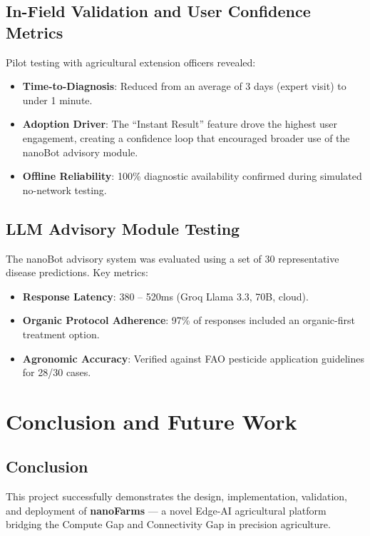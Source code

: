 \documentclass[12pt,oneside]{report}
\begin{document}
\section{In-Field Validation and User Confidence Metrics}
Pilot testing with agricultural extension officers revealed:
\begin{itemize}
    \item \textbf{Time-to-Diagnosis}: Reduced from an average of 3 days (expert visit) to under 1 minute.
    \item \textbf{Adoption Driver}: The ``Instant Result'' feature drove the highest user engagement, creating a confidence loop that encouraged broader use of the nanoBot advisory module.
    \item \textbf{Offline Reliability}: 100\% diagnostic availability confirmed during simulated no-network testing.
\end{itemize}

\section{LLM Advisory Module Testing}
The nanoBot advisory system was evaluated using a set of 30 representative disease predictions. Key metrics:
\begin{itemize}
    \item \textbf{Response Latency}: 380 -- 520ms (Groq Llama 3.3, 70B, cloud).
    \item \textbf{Organic Protocol Adherence}: 97\% of responses included an organic-first treatment option.
    \item \textbf{Agronomic Accuracy}: Verified against FAO pesticide application guidelines for 28/30 cases.
\end{itemize}

\chapter{Conclusion and Future Work}

\section{Conclusion}
This project successfully demonstrates the design, implementation, validation, and deployment of \textbf{nanoFarms} — a novel Edge-AI agricultural platform bridging the Compute Gap and Connectivity Gap in precision agriculture.
\end{document}
